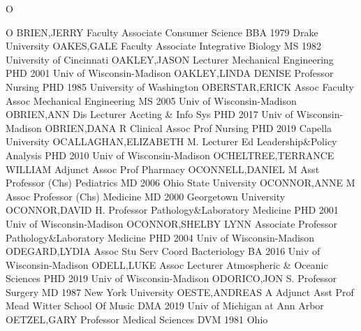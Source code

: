 \documentclass[
]{article}
\begin{document}
O

\textbar{}  \textbar{}

O BRIEN,JERRY \textbar Faculty Associate \textbar Consumer Science
\textbar BBA 1979 Drake University \textbar{} 
\textbar OAKES,GALE \textbar Faculty Associate \textbar Integrative
Biology \textbar MS 1982 University of Cincinnati \textbar{}
 \textbar OAKLEY,JASON \textbar Lecturer \textbar Mechanical
Engineering \textbar PHD 2001 Univ of Wisconsin-Madison \textbar{}
 \textbar OAKLEY,LINDA DENISE \textbar Professor
\textbar Nursing \textbar PHD 1985 University of Washington \textbar{}
 \textbar OBERSTAR,ERICK \textbar Assoc Faculty Assoc
\textbar Mechanical Engineering \textbar MS 2005 Univ of
Wisconsin-Madison \textbar{}  \textbar OBRIEN,ANN
\textbar Dis Lecturer \textbar Accting \& Info Sys \textbar PHD 2017
Univ of Wisconsin-Madison \textbar{}  \textbar OBRIEN,DANA R
\textbar Clinical Assoc Prof \textbar Nursing \textbar PHD 2019 Capella
University \textbar{}  \textbar OCALLAGHAN,ELIZABETH M.
\textbar Lecturer \textbar Ed Leadership\&Policy Analysis \textbar PHD
2010 Univ of Wisconsin-Madison \textbar{} 
\textbar OCHELTREE,TERRANCE WILLIAM \textbar Adjunct Assoc Prof
\textbar Pharmacy \textbar OCONNELL,DANIEL M \textbar{} 
\textbar Asst Professor (Chs) \textbar Pediatrics \textbar MD 2006 Ohio
State University \textbar OCONNOR,ANNE M \textbar{} 
\textbar Assoc Professor (Chs) \textbar Medicine \textbar MD 2000
Georgetown University \textbar OCONNOR,DAVID H. \textbar{} 
\textbar Professor \textbar Pathology\&Laboratory Medicine \textbar PHD
2001 Univ of Wisconsin-Madison \textbar OCONNOR,SHELBY LYNN \textbar{}
 \textbar Associate Professor \textbar Pathology\&Laboratory
Medicine \textbar PHD 2004 Univ of Wisconsin-Madison
\textbar ODEGARD,LYDIA \textbar{}  \textbar Assoc Stu Serv
Coord \textbar Bacteriology \textbar BA 2016 Univ of Wisconsin-Madison
\textbar ODELL,LUKE \textbar{}  \textbar Assoc Lecturer
\textbar Atmospheric \& Oceanic Sciences \textbar PHD 2019 Univ of
Wisconsin-Madison \textbar ODORICO,JON S. \textbar{} 
\textbar Professor \textbar Surgery \textbar MD 1987 New York University
\textbar OESTE,ANDREAS A \textbar{}  \textbar Adjunct Asst
Prof \textbar Mead Witter School Of Music \textbar DMA 2019 Univ of
Michigan at Ann Arbor \textbar OETZEL,GARY \textbar{} 
\textbar Professor \textbar Medical Sciences \textbar DVM 1981 Ohio
\end{document}
